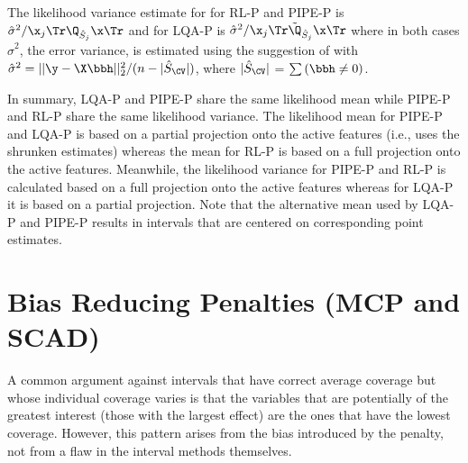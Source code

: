 The likelihood variance estimate for for RL-P and PIPE-P is $\hat{\sigma}^2 / \x_j \Tr \Q_{\hat{S}_j} \x \Tr$ and for LQA-P is $\hat{\sigma}^2 / \x_j \Tr \tilde{\Q}_{\hat{S}_j} \x \Tr$ where in both cases $\hat{\sigma}^2$, the error variance, is estimated using the suggestion of \cite{Reid2016} with $\hat{\sigma}^2 = ||\y - \X\bbh||_2^2 / (n - |\hat{S}_{\CV}|)$, where $|\hat{S}_{\CV}|$ = $\sum \left( \bbh \neq 0 \right)$.  

In summary, LQA-P and PIPE-P share the same likelihood mean while PIPE-P and RL-P share the same likelihood variance. The likelihood mean for PIPE-P and LQA-P is based on a partial projection onto the active features (i.e., uses the shrunken estimates) whereas the mean for RL-P is based on a full projection onto the active features. Meanwhile, the likelihood variance for PIPE-P and RL-P is calculated based on a full projection onto the active features whereas for LQA-P it is based on a partial projection. Note that the alternative mean used by LQA-P and PIPE-P results in intervals that are centered on corresponding point estimates.

\section{Bias Reducing Penalties (MCP and SCAD)}
\label{sec:bias_reducing}

A common argument against intervals that have correct average coverage but whose individual coverage varies is that the variables that are potentially of the greatest interest (those with the largest effect) are the ones that have the lowest coverage. However, this pattern arises from the bias introduced by the penalty, not from a flaw in the interval methods themselves.

